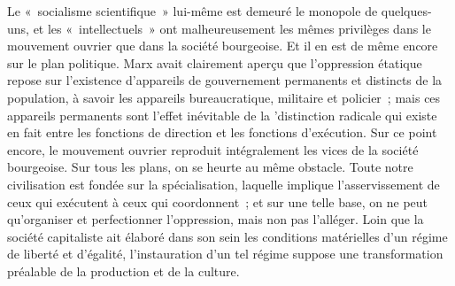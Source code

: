 \documentclass[french,twoside]{book} %
\begin{document}
Le « socialisme scientifique » lui-même est demeuré le monopole de quelques-uns, et les « intellectuels » ont malheureusement les mêmes privilèges dans le mouvement ouvrier que dans la société bourgeoise. Et il en est de même encore sur le plan politique. Marx avait clairement aperçu que l'oppression étatique repose sur l'existence d'appareils de gouvernement permanents et distincts de la population, à savoir les appareils bureaucratique, militaire et policier ; mais ces appareils permanents sont l'effet inévitable de la 'distinction radicale qui existe en fait entre les fonctions de direction et les fonctions d'exécution. Sur ce point encore, le mouvement ouvrier reproduit intégralement les vices de la société bourgeoise. Sur tous les plans, on se heurte au même obstacle. Toute notre civilisation est fondée sur la spécialisation, laquelle implique l'asservissement de ceux qui exécutent à ceux qui coordonnent ; et sur une telle base, on ne peut qu'organiser et perfectionner l'oppression, mais non pas l'alléger. Loin que la société capitaliste ait élaboré dans son sein les conditions matérielles d'un régime de liberté et d'égalité, l'instauration d'un tel régime suppose une transformation préalable de la production et de la culture.\par
\end{document}
